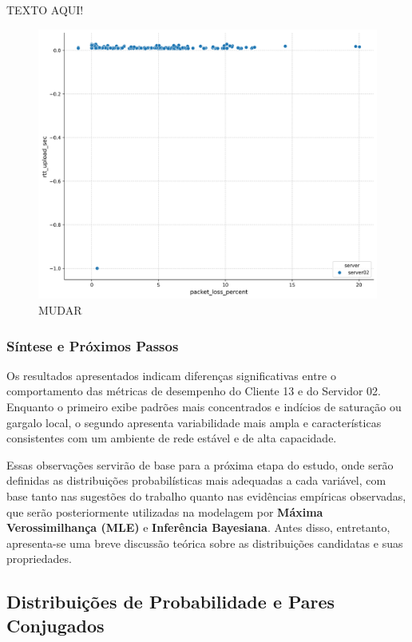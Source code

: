 \documentclass{article}
\begin{document}
TEXTO AQUI!

\begin{figure}[htp]
	\includegraphics[width=\textwidth]{../figures/eda/scatter_server02.png}
	\caption{MUDAR}
	\label{fig:scatter_server02}
\end{figure}

\subsubsection{Síntese e Próximos Passos}
Os resultados apresentados indicam diferenças significativas entre o comportamento das métricas de desempenho do Cliente 13 e do Servidor 02.  
Enquanto o primeiro exibe padrões mais concentrados e indícios de saturação ou gargalo local, o segundo apresenta variabilidade mais ampla e características consistentes com um ambiente de rede estável e de alta capacidade.  

Essas observações servirão de base para a próxima etapa do estudo, onde serão definidas as distribuições probabilísticas mais adequadas a cada variável, com base tanto nas sugestões do trabalho quanto nas evidências empíricas observadas, que serão posteriormente utilizadas na modelagem por \textbf{Máxima Verossimilhança (MLE)} e \textbf{Inferência Bayesiana}.  
Antes disso, entretanto, apresenta-se uma breve discussão teórica sobre as distribuições candidatas e suas propriedades.

\subsection{Distribuições de Probabilidade e Pares Conjugados}
\end{document}
